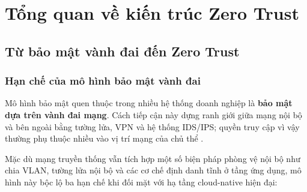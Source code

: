 \chapter[TỔNG QUAN VỀ KIẾN TRÚC ZERO TRUST]{Tổng quan về kiến trúc Zero Trust}
\label{chap:chapter1}

\section{Từ bảo mật vành đai đến Zero Trust}

\subsection{Hạn chế của mô hình bảo mật vành đai}

Mô hình bảo mật quen thuộc trong nhiều hệ thống doanh nghiệp là \textbf{bảo mật dựa trên vành đai mạng}. Cách tiếp cận này dựng ranh giới giữa mạng nội bộ và bên ngoài bằng tường lửa, VPN và hệ thống IDS/IPS; quyền truy cập vì vậy thường phụ thuộc nhiều vào vị trí mạng của chủ thể \parencite{kindervag2010build,jericho2004}.



Mặc dù mạng truyền thống vẫn tích hợp một số biện pháp phòng vệ nội bộ như chia VLAN, tường lửa nội bộ và các cơ chế định danh tĩnh ở tầng ứng dụng, mô hình này bộc lộ ba hạn chế khi đối mặt với hạ tầng cloud-native hiện đại:

